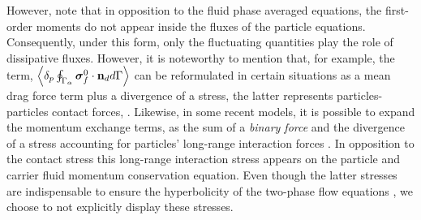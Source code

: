 However, note that in opposition to the fluid phase averaged equations, the first-order moments do not appear inside the fluxes of the particle equations. 
Consequently, under this form, only the fluctuating quantities play the role of dissipative fluxes. 
However, it is noteworthy to mention that, for example, the term, $ \left<\delta_p \oint_{\Gamma_{\alpha}} {\bm{\sigma}_f^0 \cdot \textbf{n}_d} d\Gamma\right>$ can be reformulated in certain situations as a mean drag force term plus a divergence of a stress, the latter represents particles-particles contact forces, \citet{jackson1997locally,zhang1997momentum,nott2011suspension,zhang2021ensemble}. 
Likewise, in some recent models, it is possible to expand the momentum exchange terms, as the sum of a \textit{binary force} and the divergence of a stress accounting for particles' long-range interaction forces \citep{zhang2021ensemble,nott2011suspension}. 
In opposition to the contact stress this long-range interaction stress appears on the particle and carrier fluid momentum conservation equation. 
Even though the latter stresses are indispensable to ensure the hyperbolicity of the two-phase flow equations \citep{fox2020hyperbolic}, we choose to not explicitly display these stresses. 


